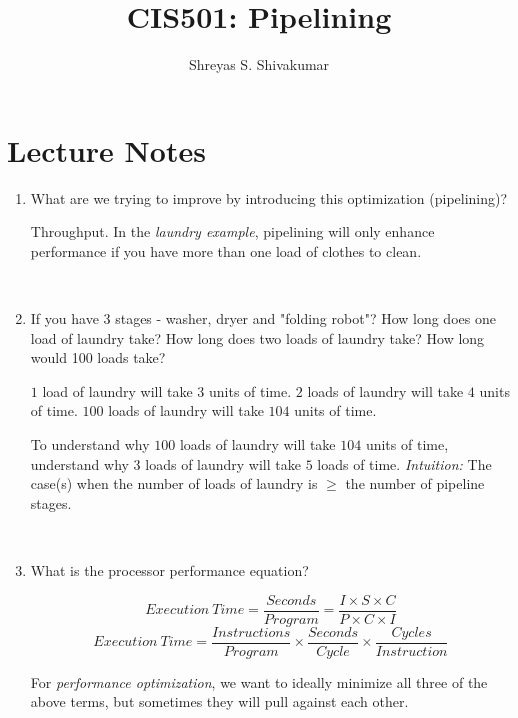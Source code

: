 \documentclass[12pt]{article}
\title{CIS501: Pipelining}
\author[1]{Shreyas S. Shivakumar}
\newenvironment{QandA}{\begin{enumerate}[label=\bfseries\arabic*.]\bfseries}
                      {\end{enumerate}}
\newenvironment{answered}{\par\quad\normalfont}{}
\begin{document}
\maketitle

\section{Lecture Notes}

\begin{QandA}
   \item What are we trying to improve by introducing this optimization (pipelining)?
        \begin{answered}
        Throughput. In the \textit{laundry example}, pipelining will only enhance performance if you have more than one load of clothes to clean.
        \end{answered}
        
    \ 
        
    \item If you have 3 stages - washer, dryer and "folding robot"? How long does one load of laundry take? How long does two loads of laundry take? How long would 100 loads take?
        \begin{answered}
            $1$ load of laundry will take $3$ units of time. $2$ loads of laundry will take $4$ units of time. $100$ loads of laundry will take $104$ units of time. 
            
            To understand why $100$ loads of laundry will take $104$ units of time, understand why $3$ loads of laundry will take $5$ loads of time. \textit{Intuition:} The case(s) when the number of loads of laundry is $\geq$ the number of pipeline stages.
        \end{answered}
      
    \ 
        
    \item What is the processor performance equation?
    \begin{answered}
    \begin{equation*}
        Execution\ Time = \frac{Seconds}{Program} = \frac{I \times S \times C}{P \times C \times I}
    \end{equation*}
    \begin{equation*}
        Execution\ Time = \frac{Instructions}{Program} \times \frac{Seconds}{Cycle} \times \frac{Cycles}{Instruction}
    \end{equation*}
    
    For \textit{performance optimization}, we want to ideally minimize all three of the above terms, but sometimes they will pull against each other.
    

\end{answered}
\end{QandA}
\end{document}
